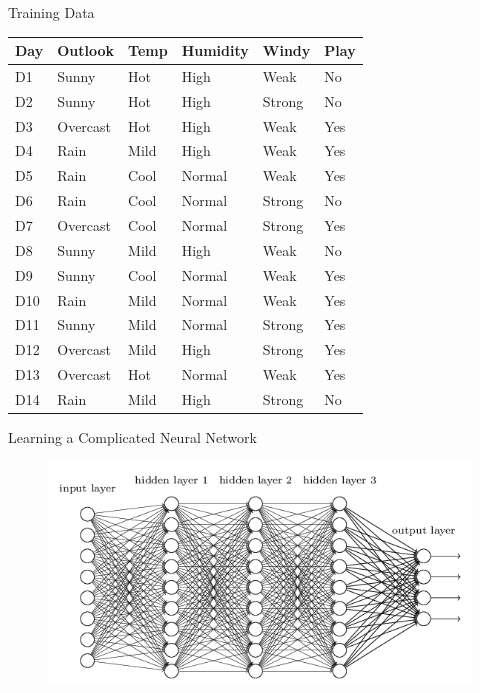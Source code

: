 \documentclass[usenames,dvipsnames]{beamer}
\begin{document}
	\renewcommand{\arraystretch}{0.85}
	\begin{frame}{Training Data}
	\begin{tabular}{lllll||l} \toprule
	\textbf{Day} & \textbf{Outlook}  & \textbf{Temp} & \textbf{Humidity} & \textbf{Windy}  & \textbf{Play} \\ \midrule
	D1  & Sunny    & Hot  & High     & Weak   & No   \\
	D2  & Sunny    & Hot  & High     & Strong & No   \\
	D3  & Overcast & Hot  & High     & Weak   & Yes  \\
	D4  & Rain     & Mild & High     & Weak   & Yes  \\
	D5  & Rain     & Cool & Normal   & Weak   & Yes  \\
	D6  & Rain     & Cool & Normal   & Strong & No   \\
	D7  & Overcast & Cool & Normal   & Strong & Yes  \\
	D8  & Sunny    & Mild & High     & Weak   & No   \\
	D9  & Sunny    & Cool & Normal   & Weak   & Yes  \\
	D10 & Rain     & Mild & Normal   & Weak   & Yes  \\
	D11 & Sunny    & Mild & Normal   & Strong & Yes  \\
	D12 & Overcast & Mild & High     & Strong & Yes  \\
	D13 & Overcast & Hot  & Normal   & Weak   & Yes  \\
	D14 & Rain     & Mild & High     & Strong & No  \\ \bottomrule
	\end{tabular}
\end{frame}

\begin{frame}{Learning a Complicated Neural Network}
\begin{figure}
	\centering
	\includegraphics[width=1\linewidth]{../diagrams/decision-trees/neural}
	
	\label{fig:neural}
\end{figure}
\end{frame}
\end{document}
